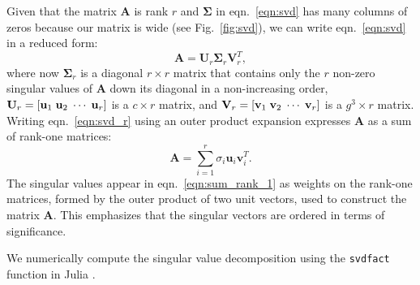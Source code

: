 \documentclass[journal=jacsat,manuscript=article,layout=traditional]{achemso}
\begin{document}
Given that the matrix $\mathbf{A}$ is rank $r$ and $\mathbf{\Sigma}$ in eqn.~\ref{eqn:svd} has many columns of zeros because our matrix is wide (see Fig.~\ref{fig:svd}), we can write eqn.~\ref{eqn:svd} in a reduced form:
\begin{equation}
\mathbf{A}=\mathbf{U}_r \mathbf{\Sigma}_r \mathbf{V}_r^T,
\label{eqn:svd_r}
\end{equation} where now $\mathbf{\Sigma}_r$ is a diagonal $r\times r$ matrix that contains only the $r$ non-zero singular values of $\mathbf{A}$ down its diagonal in a non-increasing order, $\mathbf{U}_r=[\mathbf{u}_1\hspace{1mm} \mathbf{u}_2\hspace{1mm} \cdots \hspace{1mm}\mathbf{u}_r]$ is a $c\times r$ matrix, and $\mathbf{V}_r=[\mathbf{v}_1\hspace{1mm} \mathbf{v}_2\hspace{1mm}\cdots \hspace{1mm}\mathbf{v}_r]$ is a $g^3\times r$ matrix. Writing eqn.~\ref{eqn:svd_r} using an outer product expansion expresses $\mathbf{A}$ as a sum of rank-one matrices:
\begin{equation}
\mathbf{A} = \displaystyle \sum_{i=1}^r \sigma_i \mathbf{u}_i\mathbf{v}_i^T.
\label{eqn:sum_rank_1}
\end{equation} The singular values appear in eqn.~\ref{eqn:sum_rank_1} as weights on the rank-one matrices, formed by the outer product of two unit vectors, used to construct the matrix $\mathbf{A}$. This emphasizes that the singular vectors are ordered in terms of significance.

We numerically compute the singular value decomposition using the \texttt{svdfact} function in Julia \cite{julia}.
\end{document}
